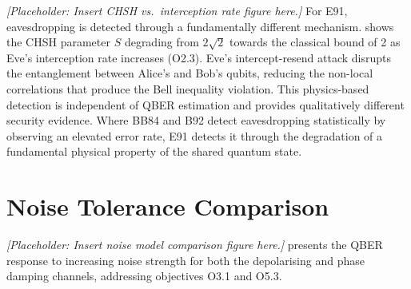 \documentclass[10pt, a4paper]{report}
\begin{document}

\textit{[Placeholder: Insert CHSH vs.\ interception rate figure here.]} For E91, eavesdropping is detected through a fundamentally different mechanism.  shows the CHSH parameter $S$ degrading from $2\sqrt{2}$ towards the classical bound of 2 as Eve's interception rate increases (O2.3). Eve's intercept-resend attack disrupts the entanglement between Alice's and Bob's qubits, reducing the non-local correlations that produce the Bell inequality violation. This physics-based detection is independent of QBER estimation and provides qualitatively different security evidence. Where BB84 and B92 detect eavesdropping statistically by observing an elevated error rate, E91 detects it through the degradation of a fundamental physical property of the shared quantum state.




\section{Noise Tolerance Comparison}


\textit{[Placeholder: Insert noise model comparison figure here.]}  presents the QBER response to increasing noise strength for both the depolarising and phase damping channels, addressing objectives O3.1 and O5.3.
\end{document}
